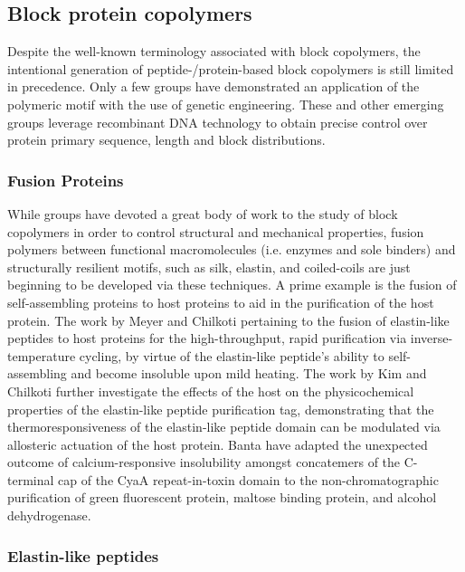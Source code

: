 \begin{refsection}
\subsection{Block protein copolymers}

Despite the well-known terminology associated with block copolymers, the
intentional generation of peptide-/protein-based block copolymers is still
limited in precedence. Only a few groups have demonstrated an application of the
polymeric motif with the use of genetic
engineering.\cite{Higashiya2007,Lim2008a,Chen2008a,Xu2005,Osborne2008} These and
other emerging groups leverage recombinant DNA technology to obtain precise
control over protein primary sequence, length and block distributions.

\subsubsection{Fusion Proteins}

While groups have devoted a great body of work to the study of block copolymers
in order to control structural and mechanical properties,\cite{Rabotyagova2009}
fusion polymers between functional macromolecules (i.e. enzymes and sole
binders) and structurally resilient motifs, such as silk, elastin, and
coiled-coils are just beginning to be developed via these
techniques.\cite{Kim2008a,Meyer1999,Wheeldon2009} A prime example is the fusion
of self-assembling proteins to host proteins to aid in the purification of the
host protein. The work by Meyer and Chilkoti pertaining to the fusion of
elastin-like peptides to host proteins for the high-throughput, rapid
purification via inverse-temperature cycling, by virtue of the elastin-like
peptide's ability to self-assembling and become insoluble upon mild
heating.\cite{Meyer1999} The work by Kim and Chilkoti further investigate the
effects of the host on the physicochemical properties of the elastin-like
peptide purification tag, demonstrating that the thermoresponsiveness of the
elastin-like peptide domain can be modulated via allosteric actuation of the
host protein.\cite{Kim2008a} Banta  have adapted the unexpected
outcome of calcium-responsive insolubility amongst concatemers of the C-terminal
cap of the CyaA repeat-in-toxin domain to the non-chromatographic purification
of green fluorescent protein, maltose binding protein, and alcohol
dehydrogenase.\cite{Shur2013}

\subsubsection{Elastin-like peptides}


\end{refsection}

